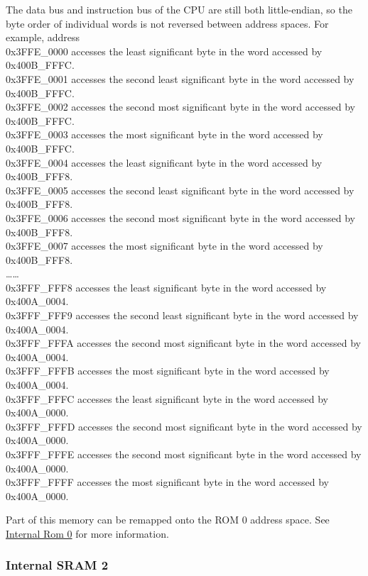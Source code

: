 \documentclass[main\_\_EN.tex]{subfiles}
\begin{document}
The data bus and instruction bus of the CPU are still both little-endian, so the byte order of individual words is not reversed between address spaces. For example, address\\
0x3FFE\_0000 accesses the least significant byte in the word accessed by 0x400B\_FFFC. \\
0x3FFE\_0001 accesses the second least significant byte in the word accessed by 0x400B\_FFFC.\\
0x3FFE\_0002 accesses the second most significant byte in the word accessed by 0x400B\_FFFC.\\
0x3FFE\_0003 accesses the most significant byte in the word accessed by 0x400B\_FFFC.\\
0x3FFE\_0004 accesses the least significant byte in the word accessed by 0x400B\_FFF8.\\
0x3FFE\_0005 accesses the second least significant byte in the word accessed by 0x400B\_FFF8.\\
0x3FFE\_0006 accesses the second most significant byte in the word accessed by 0x400B\_FFF8.\\
0x3FFE\_0007 accesses the most significant byte in the word accessed by 0x400B\_FFF8.\\
……\\
0x3FFF\_FFF8 accesses the least significant byte in the word accessed by 0x400A\_0004.\\
0x3FFF\_FFF9 accesses the second least significant byte in the word accessed by 0x400A\_0004.\\
0x3FFF\_FFFA accesses the second most significant byte in the word accessed by 0x400A\_0004.\\
0x3FFF\_FFFB accesses the most significant byte in the word accessed by 0x400A\_0004.\\
0x3FFF\_FFFC accesses the least significant byte in the word accessed by 0x400A\_0000.\\
0x3FFF\_FFFD accesses the second most significant byte in the word accessed by 0x400A\_0000.\\
0x3FFF\_FFFE accesses the second most significant byte in the word accessed by 0x400A\_0000.\\
0x3FFF\_FFFF accesses the most significant byte in the word accessed by 0x400A\_0000.

Part of this memory can be remapped onto the ROM 0 address space. See  \hyperref[para:RemapInternalROM0]{Internal Rom 0} for more information.


\subsubsection{Internal SRAM 2}
\end{document}
